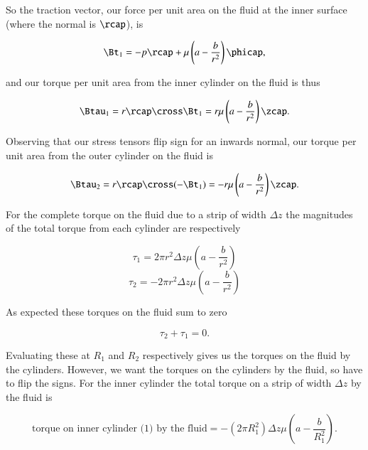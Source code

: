 So the traction vector, our force per unit area on the fluid at the inner surface (where the normal is $\rcap$), is

\begin{equation}\label{eqn:couetteFlow:1150}
\Bt_1 = -p \rcap + \mu \left( a - \frac{b}{r^2} \right) \phicap,
\end{equation}

and our torque per unit area from the inner cylinder on the fluid is thus

\begin{equation}\label{eqn:couetteFlow:1170}
\Btau_1 = r \rcap \cross \Bt_1 = r \mu \left( a - \frac{b}{r^2} \right) \zcap.
\end{equation}

Observing that our stress tensors flip sign for an inwards normal, our torque per unit area from the outer cylinder on the fluid is

\begin{equation}\label{eqn:couetteFlow:1190}
\Btau_2 = r \rcap \cross (-\Bt_1) = -r \mu \left( a - \frac{b}{r^2} \right) \zcap.
\end{equation}

For the complete torque on the fluid due to a strip of width $\Delta z$ the magnitudes of the total torque from each cylinder are respectively

\begin{equation}\label{eqn:couetteFlow:1210}
\tau_1 = 2 \pi r^2 \Delta z \mu \left( a - \frac{b}{r^2} \right)
\end{equation}
\begin{equation}\label{eqn:couetteFlow:1230}
\tau_2 = - 2 \pi r^2 \Delta z \mu \left( a - \frac{b}{r^2} \right)
\end{equation}

As expected these torques on the fluid sum to zero

\begin{equation}\label{eqn:couetteFlow:1250}
\tau_2 + \tau_1 = 0.
\end{equation}

Evaluating these at $R_1$ and $R_2$ respectively gives us the torques on the fluid by the cylinders.  However, we want the torques on the cylinders by the fluid, so have to flip the signs.  For the inner cylinder the total torque on a strip of width $\Delta z$ by the fluid is

\begin{equation}\label{eqn:couetteFlow:1270}
\text{torque on inner cylinder (1) by the fluid} = -(2 \pi R_1^2) \Delta z \mu \left( a - \frac{b}{R_1^2} \right).
\end{equation}

